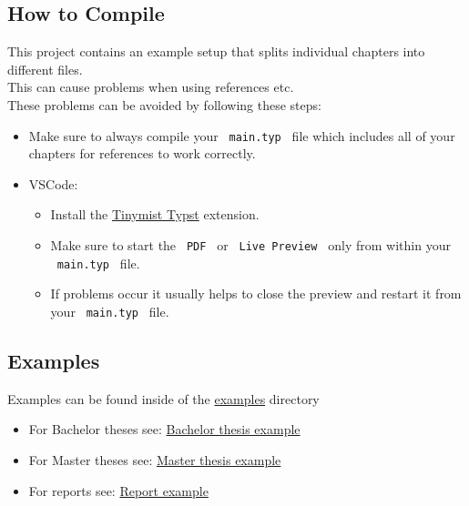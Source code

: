 \subsection{How to Compile}\label{how-to-compile}

This project contains an example setup that splits individual chapters
into different files.\\
This can cause problems when using references etc.\\
These problems can be avoided by following these steps:

\begin{itemize}
\tightlist
\item
  Make sure to always compile your \texttt{\ main.typ\ } file which
  includes all of your chapters for references to work correctly.
\item
  VSCode:

  \begin{itemize}
  \tightlist
  \item
    Install the
    \href{https://marketplace.visualstudio.com/items?itemName=myriad-dreamin.tinymist}{Tinymist
    Typst} extension.
  \item
    Make sure to start the \texttt{\ PDF\ } or
    \texttt{\ Live\ Preview\ } only from within your
    \texttt{\ main.typ\ } file.
  \item
    If problems occur it usually helps to close the preview and restart
    it from your \texttt{\ main.typ\ } file.
  \end{itemize}
\end{itemize}

\subsection{Examples}\label{examples}

Examples can be found inside of the
\href{https://github.com/LasseRosenow/HAW-Hamburg-Typst-Template/tree/main/examples}{examples}
directory

\begin{itemize}
\tightlist
\item
  For Bachelor theses see:
  \href{https://github.com/LasseRosenow/HAW-Hamburg-Typst-Template/tree/main/examples/bachelor-thesis}{Bachelor
  thesis example}
\item
  For Master theses see:
  \href{https://github.com/LasseRosenow/HAW-Hamburg-Typst-Template/tree/main/examples/master-thesis}{Master
  thesis example}
\item
  For reports see:
  \href{https://github.com/LasseRosenow/HAW-Hamburg-Typst-Template/tree/main/examples/report}{Report
  example}
\end{itemize}

